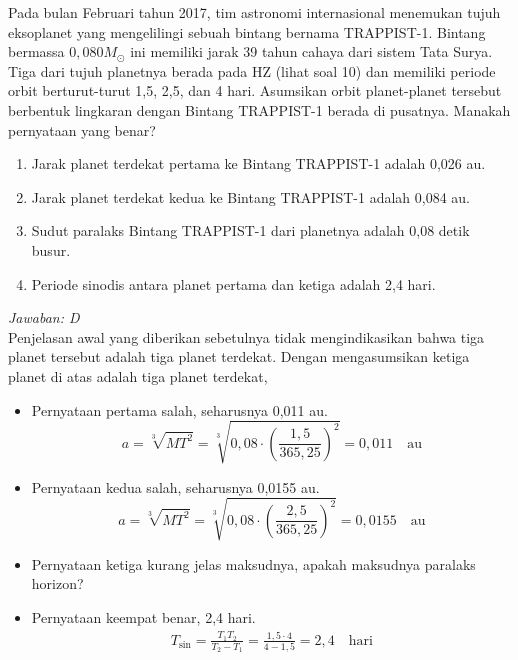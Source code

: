 \documentclass[11pt,fleqn]{exam}
\begin{document}
\begin{questions}
\vspace{0.3cm}
\question Pada bulan Februari tahun 2017, tim astronomi internasional menemukan tujuh eksoplanet yang mengelilingi sebuah bintang bernama TRAPPIST-1. Bintang bermassa $0,080 M_{\odot}$ ini memiliki jarak 39 tahun cahaya dari sistem Tata Surya. Tiga dari tujuh planetnya berada pada HZ (lihat soal 10) dan memiliki periode orbit berturut-turut 1,5, 2,5, dan 4 hari. Asumsikan orbit planet-planet tersebut berbentuk lingkaran dengan Bintang TRAPPIST-1 berada di pusatnya. Manakah pernyataan yang benar?
\begin{enumerate}
\item Jarak planet terdekat pertama ke Bintang TRAPPIST-1 adalah 0,026 au.
\item Jarak planet terdekat kedua ke Bintang TRAPPIST-1 adalah 0,084 au.
\item Sudut paralaks Bintang TRAPPIST-1 dari planetnya adalah 0,08 detik busur.
\item Periode sinodis antara planet pertama dan ketiga adalah 2,4 hari.
\end{enumerate}

\textit{Jawaban: D} \\
Penjelasan awal yang diberikan sebetulnya tidak mengindikasikan bahwa tiga planet tersebut adalah tiga planet terdekat. Dengan mengasumsikan ketiga planet di atas adalah tiga planet terdekat,
\begin{itemize}
\item Pernyataan pertama salah, seharusnya 0,011 au.
\begin{equation*}
a = \sqrt[3]{MT^2} = \sqrt[3]{0,08 \cdot \left(\frac{1,5}{365,25}\right)^2} = 0,011 \quad \text{au}
\end{equation*}
\item Pernyataan kedua salah, seharusnya 0,0155 au.
\begin{equation*}
a = \sqrt[3]{MT^2} = \sqrt[3]{0,08 \cdot \left(\frac{2,5}{365,25}\right)^2} = 0,0155 \quad \text{au}
\end{equation*}
\item Pernyataan ketiga kurang jelas maksudnya, apakah maksudnya paralaks horizon?
\item Pernyataan keempat benar,  2,4 hari.
\begin{eqnarray*}
T_{\sin} = \frac{T_1 T_2}{T_2 - T_1} = \frac{1,5 \cdot 4}{4 - 1,5} = 2,4 \quad \text{hari}
\end{eqnarray*}
\end{itemize}




\end{questions}
\end{document}
